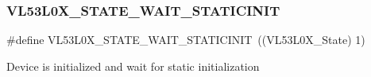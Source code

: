 \subsubsection{\texorpdfstring{V\+L53\+L0\+X\+\_\+\+S\+T\+A\+T\+E\+\_\+\+W\+A\+I\+T\+\_\+\+S\+T\+A\+T\+I\+C\+I\+N\+IT}{VL53L0X\_STATE\_WAIT\_STATICINIT}}
{\footnotesize\ttfamily \#define V\+L53\+L0\+X\+\_\+\+S\+T\+A\+T\+E\+\_\+\+W\+A\+I\+T\+\_\+\+S\+T\+A\+T\+I\+C\+I\+N\+IT~((V\+L53\+L0\+X\+\_\+\+State)  1)}

Device is initialized and wait for static initialization 